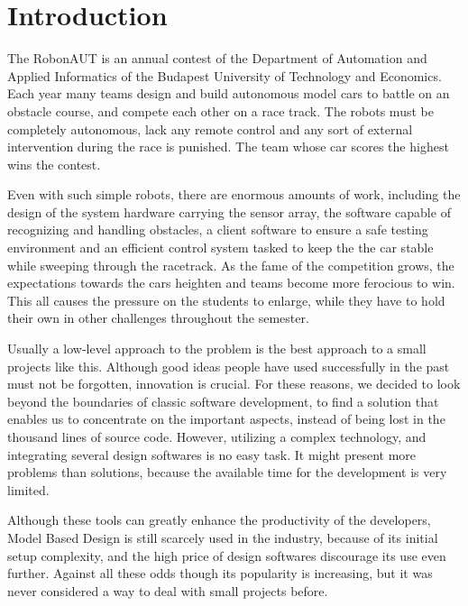 \section{Introduction}
\label{sec:Introduction}


The RobonAUT is an annual contest of the Department of Automation and Applied Informatics of the Budapest University of Technology and Economics. Each year many teams design and build autonomous model cars to battle on an obstacle course, and compete each other on a race track. The robots must be completely autonomous, lack any remote control and any sort of external intervention during the race is punished. The team whose car scores the highest wins the contest\cite{rules}.


Even with such simple robots, there are enormous amounts of work, including the design of the system hardware carrying the sensor array, the software capable of recognizing and handling obstacles, a client software to ensure a safe testing environment and an efficient control system tasked to keep the the car stable while sweeping through the racetrack. As the fame of the competition grows, the expectations towards the cars heighten and teams become more ferocious to win. This all causes the pressure on the students to enlarge, while they have to hold their own in other challenges throughout the semester.


Usually a low-level approach to the problem is the best approach to a small projects like this. Although good ideas people have used successfully in the past must not be forgotten, innovation is crucial. For these reasons, we decided to look beyond the boundaries of classic software development, to find a solution that enables us to concentrate on the important aspects, instead of being lost in the thousand lines of source code. However, utilizing a complex technology, and integrating several design softwares is no easy task. It might present more problems than solutions, because the available time for the development is very limited.


Although these tools can greatly enhance the productivity of the developers, Model Based Design is still scarcely used in the industry, because of its initial setup complexity, and the high price of design softwares discourage its use even further. Against all these odds though its popularity is increasing, but it was never considered a way to deal with small projects before.

